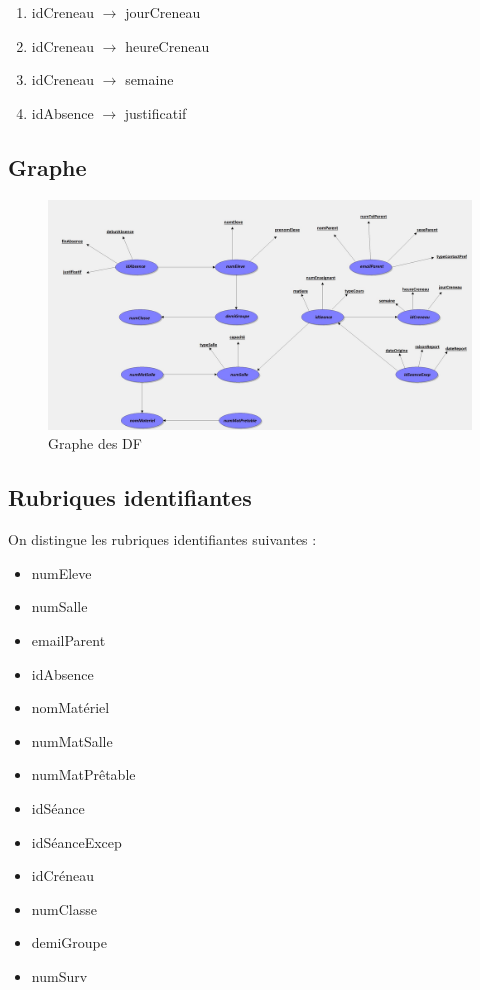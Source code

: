 \documentclass[12pt,french,titlepage]{article}
\begin{document}
\begin{enumerate}
\item idCreneau $\rightarrow$ jourCreneau   
\item	 idCreneau $\rightarrow$ heureCreneau   
\item	 idCreneau $\rightarrow$ semaine  

\item idAbsence $\rightarrow$ justificatif
      \end{enumerate}
      
      \subsection{Graphe}
      
      \begin{figure}[H]
      	\centering
      	\includegraphics[scale=0.23]{./grapheDF.jpg}
      	\caption{Graphe des DF}
      \end{figure}
  
      \subsection{Rubriques identifiantes}
      
      On distingue les rubriques identifiantes suivantes :
      
      \begin{itemize}
          \item numEleve
          \item numSalle
          \item emailParent
          \item idAbsence
          \item nomMatériel
          \item numMatSalle
          \item numMatPrêtable
          \item idSéance
          \item idSéanceExcep
          \item idCréneau
          \item numClasse
          \item demiGroupe
          \item numSurv
          
      \end{itemize}
\end{document}
